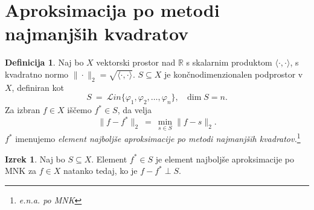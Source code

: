 \documentclass[11pt]{article}
\newcommand{\R}{\mathbb{R}}
\theoremstyle{definition}
\newtheorem{definicija}{Definicija}[section]
\theoremstyle{definition}
\newtheorem{izrek}{Izrek}[section]
\begin{document}
\pagebreak


\section{Aproksimacija po metodi najmanjših kvadratov}
\vspace{0.5cm}

\begin{definicija}

Naj bo $X$ vektorski prostor nad $\R$ s skalarnim produktom $\langle \cdot, \cdot \rangle$, s kvadratno normo $\|\cdot\|_2 = \sqrt{\langle \cdot, \cdot \rangle}$. $S \subseteq X$ je končnodimenzionalen podprostor v $X$, definiran kot
$$S ~=~ \mathcal{L}\textit{in}\{\varphi_1, \varphi_2, \ldots, \varphi_n\}, ~~~\dim{S} = n.$$
Za izbran $f \in X$ iščemo $f^* \in S$, da velja
$$\|f - f^*\|_2 ~=~ \min_{s \in S}\|f - s\|_2.$$
$f^*$ imenujemo \textit{element najboljše aproksimacije po metodi najmanjših kvadratov.}\footnote{\textit{e.n.a. po MNK}}

\end{definicija}
\vspace{0.5cm}

\begin{izrek}

Naj bo $S \subseteq X.$ Element $f^* \in S$ je element najboljše aproksimacije po MNK za $f \in X$ natanko tedaj, ko je $f - f^* \perp S$.

\end{izrek}
\vspace{0.5cm}
\end{document}

